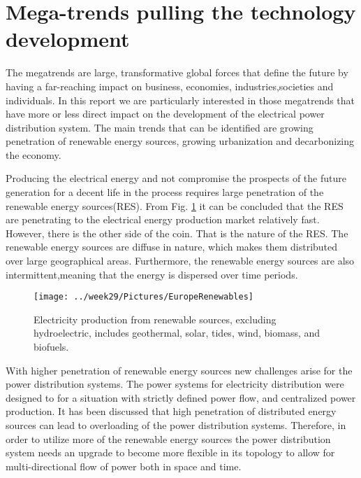 \documentclass[]{scrartcl}
\begin{document}
\newpage
\section{Mega-trends pulling the technology development}

The megatrends are large, transformative global forces that define the future by having a far-reaching impact on business, economies, industries,societies and individuals\cite{EY2015}. In this report we are particularly interested in those megatrends that have more or less direct impact on the development of the electrical power distribution system. The main trends that can be identified are growing penetration of renewable energy sources, growing urbanization and decarbonizing the economy. 


Producing the electrical energy and not compromise the prospects of the future generation for a decent life in the process requires large penetration of the renewable energy sources(RES).  From Fig. \ref{fig:europerenewables} it can be concluded that the RES are penetrating to the electrical energy production market relatively fast. However, there is the other side of the coin. That is the nature of the RES. The renewable energy sources are diffuse in nature, which makes them distributed over large geographical areas. Furthermore, the renewable energy sources are also intermittent,meaning that the energy is dispersed over time periods. 

\begin{figure}[h!]
	\centering
	\texttt{[image: ../week29/Pictures/EuropeRenewables]}
	\caption{Electricity production from renewable sources, excluding hydroelectric, includes geothermal, solar, tides, wind, biomass, and biofuels.}
	\label{fig:europerenewables}
\end{figure}
\newpage


With higher penetration of renewable energy sources new challenges arise for the power distribution systems. The power systems for electricity distribution were designed to for a situation with strictly defined power flow, and centralized power production.  It has been discussed that high penetration of distributed energy sources can lead to overloading of the power distribution systems\cite{Garrity2009}.
Therefore, in order to utilize more of the renewable energy sources the power distribution system needs an upgrade to become more flexible in its topology to allow for multi-directional flow of power both in space and time\cite{Doncker2014}. 
\end{document}
